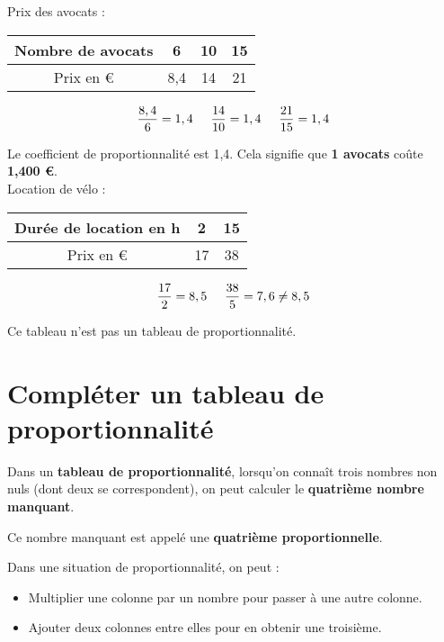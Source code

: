 \documentclass[a4paper,dvipsnames]{article}
\begin{document}
\begin{Ex}
Prix des avocats :
\begin{center}
    \begin{tabular}{c||c|c|c}
        Nombre de avocats & 6 & 10 & 15  \\
        \hline Prix en \euro & 8,4 & 14 & 21 \\
    \end{tabular}
\end{center}
    
\[\frac{8,4}{6}=1,4\hspace{.5cm}\frac{14}{10}=1,4\hspace{.5cm}\frac{21}{15}=1,4\]

Le coefficient de proportionnalité est 1,4. Cela signifie que \textbf{1 avocats} coûte \textbf{1,400 \euro}.\\

Location de vélo :
\begin{center}
    \begin{tabular}{c||c|c}
        Durée de location en h & 2 & 15  \\
        \hline Prix en \euro & 17 & 38 \\ 
    \end{tabular}
\end{center}
    
\[\frac{17}{2}=8,5\hspace{.5cm}\frac{38}{5}=7,6\neq8,5\]

Ce tableau n'est pas un tableau de proportionnalité.
\end{Ex}

\section{Compléter un tableau de proportionnalité}

\begin{Def}
Dans un \textbf{tableau de proportionnalité}, lorsqu'on connaît trois nombres non nuls (dont deux se correspondent), on peut calculer le \textbf{quatrième nombre manquant}.

Ce nombre manquant est appelé une \textbf{quatrième proportionnelle}.
\end{Def}

\begin{Pp}
Dans une situation de proportionnalité, on peut :
\begin{itemize}
\item Multiplier une colonne par un nombre pour passer à une autre colonne.
\item Ajouter deux colonnes entre elles pour en obtenir une troisième.
\end{itemize}
\end{Pp} 
\end{document}
